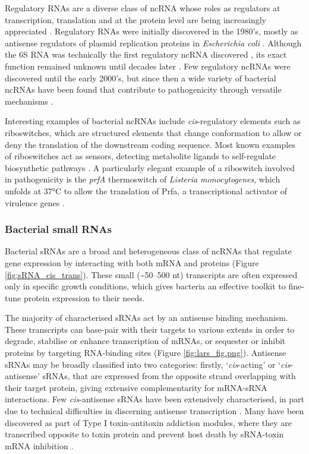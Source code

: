 Regulatory RNAs are a diverse class of ncRNA whose roles as regulators at transcription, translation and at the protein level are being increasingly appreciated \citep{Cech2014-pe}. Regulatory RNAs were initially discovered in the 1980’s, mostly as antisense regulators of plasmid replication proteins in \textit{Escherichia coli} \citep{Conrad1979-xe,Stougaard1981-np,Inouye1988-rv}. Although the 6S RNA was technically the first regulatory ncRNA discovered \citep{Brownlee1971-lh}, its exact function remained unknown until decades later \citep{Barrick2005-if}. Few regulatory ncRNAs were discovered until the early 2000’s, but since then a wide variety of bacterial ncRNAs have been found that contribute to pathogenicity through versatile mechanisms \citep{Papenfort2010-cj}.\par

Interesting examples of bacterial ncRNAs include \textit{cis}-regulatory elements such as riboswitches, which are structured elements that change conformation to allow or deny the translation of the downstream coding sequence. Most known examples of riboswitches act as sensors, detecting metabolite ligands to self-regulate biosynthetic pathways \citep{Serganov2013-fz}. A particularly elegant example of a riboswitch involved in pathogenicity is the \textit{prfA} thermoswitch of \textit{Listeria monocytogenes}, which unfolds at 37°C to allow the translation of Prfa, a transcriptional activator of virulence genes \citep{Johansson2002-ar}.\par

\subsubsection{Bacterial small RNAs} 

Bacterial sRNAs are a broad and heterogeneous class of ncRNAs that regulate gene expression by interacting with both mRNA and proteins (Figure \ref{fig:sRNA_cis_trans}). These small (\textasciitilde50--500 nt) transcripts are often expressed only in specific growth conditions, which gives bacteria an effective toolkit to fine-tune protein expression to their needs.\par
The majority of characterised sRNAs act by an antisense binding mechanism. These transcripts can base-pair with their targets to various extents in order to degrade, stabilise or enhance transcription of mRNAs, or sequester or inhibit proteins by targeting RNA-binding sites \citep{Storz2011-tb,Barquist2015-pa} (Figure \ref{fig:lars_fig.png}). Antisense sRNAs may be broadly classified into two categories: firstly, ‘\textit{cis}-acting’ or ‘\textit{cis}-antisense’ sRNAs, that are expressed from the opposite strand overlapping with their target protein, giving extensive complementarity for mRNA-sRNA interactions. Few \textit{cis}-antisense sRNAs have been extensively characterised, in part due to technical difficulties in discerning antisense transcription \citep{Georg2011-ee}. Many have been discovered as part of Type I toxin-antitoxin addiction modules, where they are transcribed opposite to toxin protein and prevent host death by sRNA-toxin mRNA inhibition \citep{Brantl2012-ad}. \par

